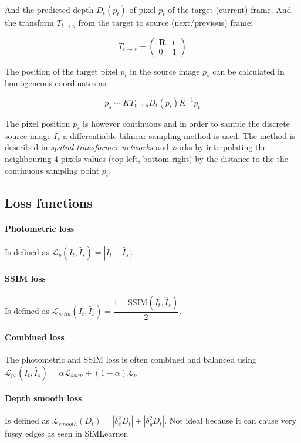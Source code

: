 And the predicted depth $ D_t(p_t) $ of pixel $ p_t $ of the target (current) frame. And the transform $ T_{t \rightarrow s} $ from the target to source (next/previous) frame:

\[
T_{t \rightarrow s} =
\begin{pmatrix}
\textbf{R} & \textbf{t} \\
0 & 1
\end{pmatrix}
\]

The position of the target pixel $ p_t $ in the source image $ p_s $ can be calculated in homogeneous coordinates as:

\[
p_s \sim K T_{t \rightarrow s} D_t(p_t) K^{-1} p_t 
\]

The pixel position $ p_s $ is however continuous and in order to sample the discrete source image $ I_s $ a differentiable bilinear sampling method is used. The method is described in \textit{spatial transformer networks}\cite{spatialtransformernetworks} and works by interpolating the neighbouring 4 pixels values (top-left, bottom-right) by the distance to the the continuous sampling point $ p_t $.

\subsection{Loss functions}
\label{sec:loss}

\paragraph{Photometric loss} Is defined as $ \mathcal{L}_p(I_t, \hat{I}_s)=|I_t - \hat{I}_s| $.

\paragraph{SSIM loss} Is defined as $ \mathcal{L}_{ssim}(I_t, \hat{I}_s)=\dfrac{1-\textrm{SSIM}(I_t, \hat{I}_s)}{2} $.

\paragraph{Combined loss} The photometric and SSIM loss is often combined and balanced using $ \mathcal{L}_{ps}(I_t, \hat{I}_s) = \alpha \mathcal{L}_{ssim} + (1-\alpha) \mathcal{L}_p $

\paragraph{Depth smooth loss} Is defined as $ \mathcal{L}_{smooth}(D_t)=|\delta_x^2 D_t|+|\delta_y^2 D_t| $. Not ideal because it can cause very fussy edges as seen in SfMLearner.


